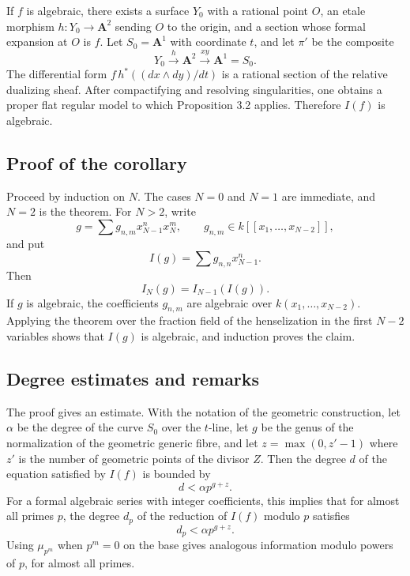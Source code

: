 \documentclass[11pt]{article}
\theoremstyle{remark}
\newcommand{\A}{\mathbf A}
\begin{document}
If $f$ is algebraic, there exists a surface $Y_0$ with a rational point $O$, an etale morphism $h:Y_0\to\A^2$ sending $O$ to the origin, and a section whose formal expansion at $O$ is $f$. Let $S_0=\A^1$ with coordinate $t$, and let $\pi'$ be the composite
\[
 Y_0\xrightarrow{h}\A^2\xrightarrow{xy}\A^1=S_0.
\]
The differential form $f\,h^*((dx\wedge dy)/dt)$ is a rational section of the relative dualizing sheaf. After compactifying and resolving singularities, one obtains a proper flat regular model to which Proposition 3.2 applies. Therefore $I(f)$ is algebraic.

\subsection*{Proof of the corollary}

Proceed by induction on $N$. The cases $N=0$ and $N=1$ are immediate, and $N=2$ is the theorem. For $N>2$, write
\[
 g=\sum g_{n,m}x_{N-1}^n x_N^m,
\qquad g_{n,m}\in k[[x_1,\ldots,x_{N-2}]],
\]
and put
\[
 I(g)=\sum g_{n,n}x_{N-1}^n.
\]
Then
\begin{equation}\tag{3.6.1}
 I_N(g)=I_{N-1}(I(g)).
\end{equation}
If $g$ is algebraic, the coefficients $g_{n,m}$ are algebraic over $k(x_1,\ldots,x_{N-2})$. Applying the theorem over the fraction field of the henselization in the first $N-2$ variables shows that $I(g)$ is algebraic, and induction proves the claim.

\subsection*{Degree estimates and remarks}

The proof gives an estimate. With the notation of the geometric construction, let $\alpha$ be the degree of the curve $S_0$ over the $t$-line, let $g$ be the genus of the normalization of the geometric generic fibre, and let $z=\max(0,z'-1)$ where $z'$ is the number of geometric points of the divisor $Z$. Then the degree $d$ of the equation satisfied by $I(f)$ is bounded by
\begin{equation}\tag{3.7.1}
 d<\alpha p^{g+z}.
\end{equation}
For a formal algebraic series with integer coefficients, this implies that for almost all primes $p$, the degree $d_p$ of the reduction of $I(f)$ modulo $p$ satisfies
\begin{equation}\tag{3.7.2}
 d_p<\alpha p^{g+z}.
\end{equation}
Using $\mu_{p^m}$ when $p^m=0$ on the base gives analogous information modulo powers of $p$, for almost all primes.
\end{document}
